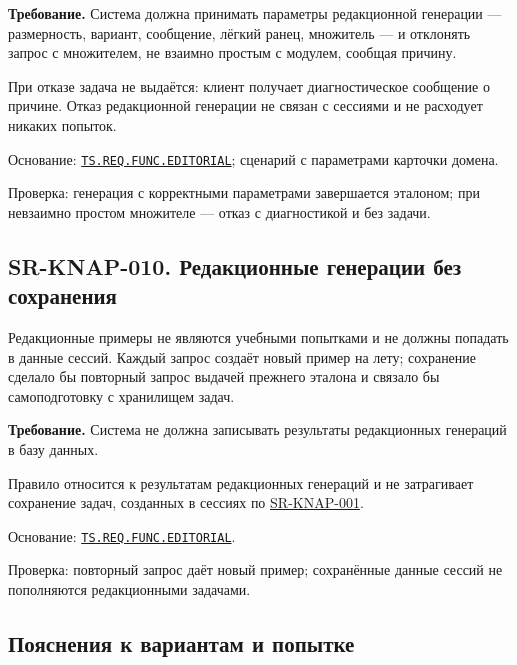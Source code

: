 \documentclass[12pt,a4paper]{article}
\begin{document}
\textbf{Требование.} Система должна принимать параметры редакционной генерации --- размерность, вариант, сообщение, лёгкий ранец, множитель --- и отклонять запрос с множителем, не взаимно простым с модулем, сообщая причину.

При отказе задача не выдаётся: клиент получает диагностическое сообщение о причине. Отказ редакционной генерации не связан с сессиями и не расходует никаких попыток.

Основание: {\href{../02\_Техническое\_задание/Техническое\_задание.pdf\#ts-req-func-editorial}{\texttt{TS.\allowbreak{}REQ.\allowbreak{}FUNC.\allowbreak{}EDITORIAL}}}; сценарий с параметрами карточки домена.

Проверка: генерация с корректными параметрами завершается эталоном; при невзаимно простом множителе --- отказ с диагностикой и без задачи.

\subsection{SR-KNAP-010. Редакционные генерации без сохранения}\label{sr-knap-010-ux440ux435ux434ux430ux43aux446ux438ux43eux43dux43dux44bux435-ux433ux435ux43dux435ux440ux430ux446ux438ux438-ux431ux435ux437-ux441ux43eux445ux440ux430ux43dux435ux43dux438ux44f}

\hypertarget{sr-knap-010-редакционные-генерации-без-сохранения}{}

\hypertarget{sr-knap-010}{}

Редакционные примеры не являются учебными попытками и не должны попадать в данные сессий. Каждый запрос создаёт новый пример на лету; сохранение сделало бы повторный запрос выдачей прежнего эталона и связало бы самоподготовку с хранилищем задач.

\textbf{Требование.} Система не должна записывать результаты редакционных генераций в базу данных.

Правило относится к результатам редакционных генераций и не затрагивает сохранение задач, созданных в сессиях по {\hyperlink{sr-knap-001}{SR-KNAP-001}}.

Основание: {\href{../02\_Техническое\_задание/Техническое\_задание.pdf\#ts-req-func-editorial}{\texttt{TS.\allowbreak{}REQ.\allowbreak{}FUNC.\allowbreak{}EDITORIAL}}}.

Проверка: повторный запрос даёт новый пример; сохранённые данные сессий не пополняются редакционными задачами.

\subsection{Пояснения к вариантам и попытке}\label{ux43fux43eux44fux441ux43dux435ux43dux438ux44f-ux43a-ux432ux430ux440ux438ux430ux43dux442ux430ux43c-ux438-ux43fux43eux43fux44bux442ux43aux435}
\end{document}
